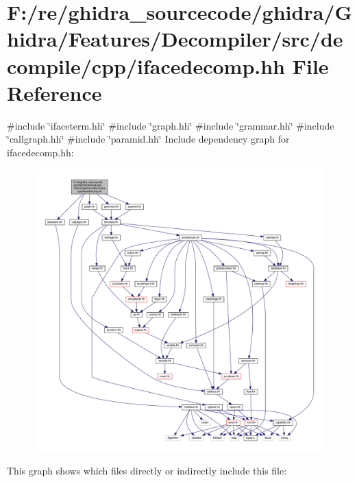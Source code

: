 \hypertarget{ifacedecomp_8hh}{}\section{F\+:/re/ghidra\+\_\+sourcecode/ghidra/\+Ghidra/\+Features/\+Decompiler/src/decompile/cpp/ifacedecomp.hh File Reference}
\label{ifacedecomp_8hh}
{\ttfamily \#include \char`\"{}ifaceterm.\+hh\char`\"{}}\newline
{\ttfamily \#include \char`\"{}graph.\+hh\char`\"{}}\newline
{\ttfamily \#include \char`\"{}grammar.\+hh\char`\"{}}\newline
{\ttfamily \#include \char`\"{}callgraph.\+hh\char`\"{}}\newline
{\ttfamily \#include \char`\"{}paramid.\+hh\char`\"{}}\newline
Include dependency graph for ifacedecomp.\+hh\+:
\nopagebreak
\begin{figure}[H]
\begin{center}
\leavevmode
\includegraphics[width=350pt]{ifacedecomp_8hh__incl}
\end{center}
\end{figure}
This graph shows which files directly or indirectly include this file\+:
\nopagebreak
